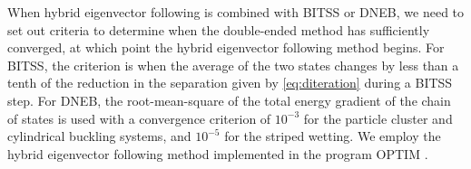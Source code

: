 \documentclass[aip,jcp,reprint,twocolumn]{revtex4-1}
\begin{document}
When hybrid eigenvector following is combined with BITSS or DNEB, we need to set out criteria to determine when the double-ended method has sufficiently converged, at which point the hybrid eigenvector following method begins.
For BITSS, the criterion is when the average of the two states changes by less than a tenth of the reduction in the separation given by \cref{eq:diteration} during a BITSS step.
For DNEB, the root-mean-square of the total energy gradient of the chain of states is used with a convergence criterion of $10^{-3}$ for the particle cluster and cylindrical buckling systems, and $10^{-5}$ for the striped wetting.
We employ the hybrid eigenvector following method implemented in the program OPTIM \cite{OPTIM}.



\end{document}
